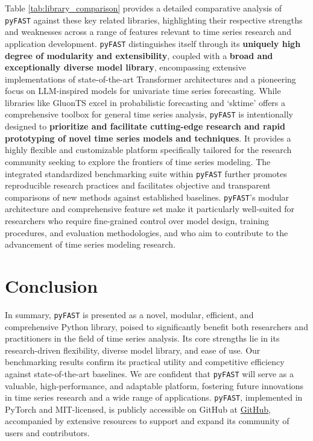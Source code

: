 \documentclass{article}
\begin{document}
Table \ref{tab:library_comparison} provides a detailed comparative analysis of \texttt{pyFAST} against these key related libraries, highlighting their respective strengths and weaknesses across a range of features relevant to time series research and application development.  \texttt{pyFAST} distinguishes itself through its \textbf{uniquely high degree of modularity and extensibility}, coupled with a \textbf{broad and exceptionally diverse model library}, encompassing extensive implementations of state-of-the-art Transformer architectures and a pioneering focus on LLM-inspired models for univariate time series forecasting.  While libraries like GluonTS excel in probabilistic forecasting and `sktime' offers a comprehensive toolbox for general time series analysis, \texttt{pyFAST} is intentionally designed to \textbf{prioritize and facilitate cutting-edge research and rapid prototyping of novel time series models and techniques}.  It provides a highly flexible and customizable platform specifically tailored for the research community seeking to explore the frontiers of time series modeling.  The integrated standardized benchmarking suite within \texttt{pyFAST} further promotes reproducible research practices and facilitates objective and transparent comparisons of new methods against established baselines.  \texttt{pyFAST}'s modular architecture and comprehensive feature set make it particularly well-suited for researchers who require fine-grained control over model design, training procedures, and evaluation methodologies, and who aim to contribute to the advancement of time series modeling research.

\section{Conclusion}
In summary, \texttt{pyFAST} is presented as a novel, modular, efficient, and comprehensive Python library, poised to significantly benefit both researchers and practitioners in the field of time series analysis. Its core strengths lie in its research-driven flexibility, diverse model library, and ease of use.  Our benchmarking results confirm its practical utility and competitive efficiency against state-of-the-art baselines. We are confident that \texttt{pyFAST} will serve as a valuable, high-performance, and adaptable platform, fostering future innovations in time series research and a wide range of applications. \texttt{pyFAST}, implemented in PyTorch and MIT-licensed, is publicly accessible on GitHub at \href{https://github.com/anonymous-code-for-peer-review/pyFAST}{GitHub}, accompanied by extensive resources to support and expand its community of users and contributors.



\end{document}

